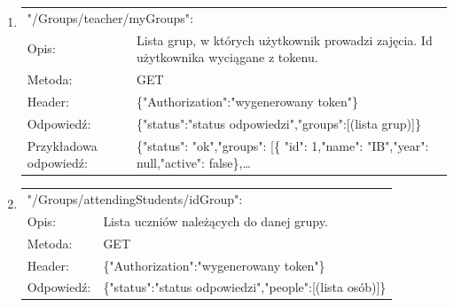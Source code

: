 \documentclass[12pt, titlepage]{article}
\begin{document}
\begin{enumerate}
	\item 
	{\renewcommand{\arraystretch}{1.5}
	\begin{tabular}[t]{p{3cm} p{15cm}}
	\multicolumn{2}{l}{"/Groups/teacher/myGroups":} \\
	Opis: &  Lista grup, w których użytkownik prowadzi zajęcia. \newline Id użytkownika wyciągane z tokenu. \\
	Metoda: & GET \\
	Header: & \{"Authorization":"wygenerowany token"\} \\
	Odpowiedź: & \{"status":"status odpowiedzi",\newline "groups":[(lista grup)]\} \\
	Przykładowa \newline odpowiedź: & 			\{"status": "ok",\newline "groups": [\newline \{ "id": 1,\newline "name": "IB",\newline "year": null,\newline "active": false\},\newline \ldots
	\end{tabular}}
	
	\item 
	{\renewcommand{\arraystretch}{1.5}
	\begin{tabular}[t]{p{3cm} p{15cm}}
	\multicolumn{2}{l}{"/Groups/attendingStudents/{idGroup}":} \\
	Opis: &  Lista uczniów należących do danej grupy. \\
	Metoda: & GET \\
	Header: & \{"Authorization":"wygenerowany token"\} \\
	Odpowiedź: & \{"status":"status odpowiedzi",\newline "people":[(lista osób)]\}
	\end{tabular}}
	

\end{enumerate}
\end{document}
